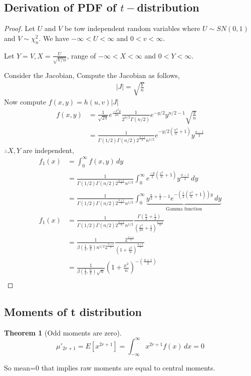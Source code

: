 \documentclass[oneside,11pt,pdftex]{book}%
\numberwithin{equation}{section}
\newtheorem{theorem}{Theorem}[chapter]%
\numberwithin{section}{chapter}
\numberwithin{equation}{chapter}
\begin{document}
\subsection{Derivation of PDF of $ t- $distribution}
\begin{proof}
	Let $ U $ and $ V $ be tow independent random variables where $ U \sim SN(0,1) $ and $ V \sim \chi^2_n $. We have $ -\infty < U < \infty $ and $ 0<v< \infty $.
	
	Let $ Y=V, X=\frac{U}{\sqrt{V/n}} $, range of $-\infty< X < \infty$ and $ 0<Y<\infty $.
	
	Consider the Jacobian,
	Compute the Jacobian as follows,
	\begin{align*}
		|J|=\sqrt{\frac{Y}{n}}
	\end{align*}
	Now compute $ f(x,y) =h(u,v) |J|$
	\begin{align*}
		f(x,y)&=\frac{1}{\sqrt{2 \pi}}e^{\frac{-x^2y}{2n}}\frac{1}{2^{n/2}\Gamma(n/2)}e^{-y/2}y^{n/2-1} \sqrt{\frac{y}{n}}\\
		&=\frac{1}{\Gamma(1/2)\Gamma(n/2)2^{\frac{n+1}{2}}n^{1/2}}e^{-y/2\left(\frac{x^2}{n}+1\right)}y^{\frac{n-1}{2}}
	\end{align*}
	$ \therefore X, Y $ are independent,
	\begin{align*}
		f_1(x)&=\int_0^\infty f(x,y)\, dy\\
		&=\frac{1}{\Gamma(1/2)\Gamma(n/2)2^{\frac{n+1}{2}}n^{1/2}} \int_0^\infty e^{\frac{-y}{2}\left( \frac{x^2}{n}+1 \right)}y^{\frac{n-1}{2}}\, dy\\
		&=\frac{1}{\Gamma(1/2)\Gamma(n/2)2^{\frac{n+1}{2}}n^{1/2}} \int_0^\infty \underbrace{y^{\frac{n}{2}+\frac{1}{2}-1}e^{-\left(\frac{1}{2}\left(\frac{x^2}{n}+1\right)\right)y}\, dy}_{\text{Gamma function}}\\
		f_1(x)&=\frac{1}{\Gamma(1/2)\Gamma(n/2)2^{\frac{n+1}{2}}n^{1/2}} \frac{\Gamma\left(\frac{n}{2}+\frac{1}{2} \right)}{\left(\frac{x^2}{2n}+\frac{1}{2}\right)^\frac{n+1}{2}}\\
		&=\frac{1}{\beta\left(\frac{1}{2},\frac{n}{2}\right)n^{1/2}2^{\frac{n+1}{2}}}\frac{2^{\frac{n+1}{2}}}{\left(1+\frac{x^2}{n}\right)^{\frac{n+1}{2}}}\\
		&=\frac{1}{\beta\left(\frac{1}{2}, \frac{n}{2}\right) \sqrt{n}} \left(1+\frac{x^2}{n}\right)^{-\left(\frac{n+1}{2}\right)}\\
	\end{align*}
\end{proof}

\subsection{Moments of t distribution}
\begin{theorem}[Odd moments are zero]
	\[ \mu'_{2r+1}=E[x^{2r+1}]=\int_{-\infty}^\infty x^{2r+1}f(x)\, dx =0\]
\end{theorem}
So mean=0 that implies raw moments are equal to central moments.
\end{document}
